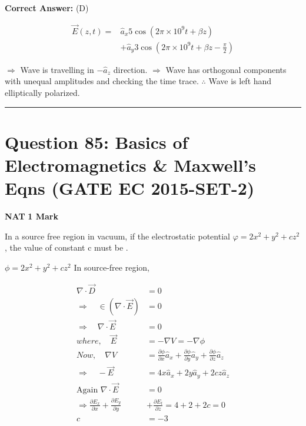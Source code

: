\documentclass[11pt,a4paper]{article}
\begin{document}
\noindent \textbf{Correct Answer:} (D)

\begin{tcolorbox}[solbox, title=Detailed Solution -- Question 84]
\[
\begin{aligned} \vec{E}(z, t)=& \hat{a}_{x} 5 \cos \left(2 \pi \times 10^{9} t+\beta z\right) \\ &+\hat{a}_{y} 3 \cos \left(2 \pi \times 10^{9} t+\beta z-\frac{\pi}{2}\right) \end{aligned}
\]

$\Rightarrow$ Wave is travelling in $-\hat{a}_{z}$ direction.
$\Rightarrow$ Wave has orthogonal components with unequal  amplitudes and checking the time trace.
$\therefore$ Wave is left hand elliptically polarized.
\end{tcolorbox}

\vspace{1.5em}
\hrule
\vspace{1.5em}

\section*{Question 85: Basics of Electromagnetics \& Maxwell's Eqns (GATE EC 2015-SET-2)}
\noindent \textbf{\color{primary}NAT} \hfill \textbf{\color{secondary}1 Mark}


\noindent In a source free region in vacuum, if the electrostatic potential $\varphi = 2x^{2}+y^{2}+cz^{2}$, the value of constant c must be \underline{\hspace{1.5cm}}.


\begin{tcolorbox}[solbox, title=Detailed Solution -- Question 85]
$\phi=2 x^{2}+y^{2}+c z^{2}$
 In source-free region, 

\[
\begin{aligned} \nabla \cdot \vec{D}&=0 \\ \Rightarrow \quad \in(\nabla \cdot \vec{E}) &=0 \\ \Rightarrow \quad \nabla \cdot \vec{E} &=0\\ where,\quad\vec{E}&=-\nabla V=-\nabla \phi \\ Now, \quad \nabla V&=\frac{\partial \phi}{\partial x} \hat{a}_{x}+\frac{\partial \phi}{\partial y} \hat{a}_{y}+\frac{\partial \phi}{\partial z} \hat{a}_{z} \\ \Rightarrow \quad -\vec{E}&=4 x \hat{a}_{x}+2 y \hat{a}_{y}+2 c z \hat{a}_{z} \\ \text{Again }\nabla \cdot \vec{E}&=0 \\ \Rightarrow \frac{\partial E_{x}}{\partial x}+\frac{\partial E_{y}}{\partial y}&+\frac{\partial E_{t}}{\partial z}=4+2+2 c=0 \\ c&=-3 \end{aligned}
\]
\end{tcolorbox}
\end{document}

